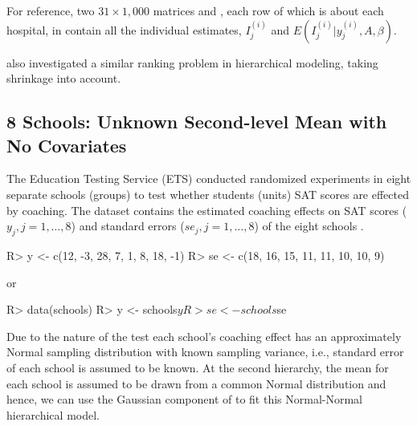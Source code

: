 \documentclass[article]{jss}
\begin{document}
For reference, two $31 \times 1,000$ matrices  and , each row of which is about each hospital, in  contain all the individual estimates, $I^{(i)}_{j}$ and $E(I^{(i)}_{j}\vert y^{(i)}_{j}, A, \beta)$.

\cite{1995} also investigated a similar ranking problem in hierarchical modeling, taking shrinkage into account.


\subsection[Unknown Second-level Mean and No Covariate]{8 Schools: Unknown Second-level Mean with No Covariates} \label{sec:ex:8schools}

The Education Testing Service (ETS) conducted randomized experiments in eight separate schools (groups) to test whether students (units) SAT scores are effected by coaching. The dataset contains the estimated coaching effects on SAT scores ($y_{j}, j=1, \ldots, 8$) and standard errors ($se_{j}, j=1, \ldots, 8$) of the eight schools \citep{1981}.
\begin{CodeChunk}
\begin{CodeInput}
R> y  <- c(12, -3, 28,  7,  1,  8, 18, -1)
R> se <- c(18, 16, 15, 11, 11, 10, 10,  9)
\end{CodeInput}
\end{CodeChunk}
or
\begin{CodeChunk}
\begin{CodeInput}
R> data(schools)
R> y  <- schools$y
R> se <- schools$se
\end{CodeInput}
\end{CodeChunk}



Due to the nature of the test each school's coaching effect has an approximately Normal sampling distribution with known sampling variance, i.e., standard error of each school is assumed to be known. At the second hierarchy, the mean for each school is assumed to be drawn from a common Normal distribution and hence, we can use the Gaussian component of  to fit this Normal-Normal hierarchical model.
\end{document}
